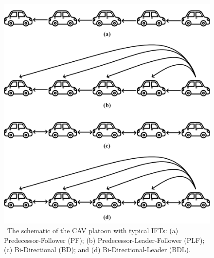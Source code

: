 \documentclass[a4paper]{cas-sc}
\begin{document}
\begin{figure}
  \centering

  \includegraphics[width=14cm]{figs/fig1.png}
  \caption{~The schematic of the CAV platoon with typical IFTs: (a) Predecessor-Follower (PF); (b) Predecessor-Leader-Follower (PLF); (c) Bi-Directional (BD); and (d) Bi-Directional-Leader (BDL).}
  \label{fig1}
\end{figure}
\end{document}
